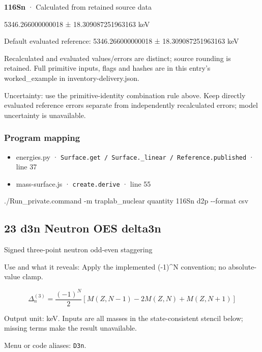 \documentclass[
  11pt,
  letterpaper,
]{article}
\newenvironment{Shaded}{}{}
\newcommand{\AttributeTok}[1]{\textcolor[rgb]{0.49,0.56,0.16}{#1}}
\newcommand{\ExtensionTok}[1]{#1}
\newcommand{\NormalTok}[1]{#1}
\providecommand{\tightlist}{%
  \setlength{\itemsep}{0pt}\setlength{\parskip}{0pt}}
\begin{document}
\textbf{116Sn} · Calculated from retained source data

5346.266000000018 ± 18.309087251963163 keV

Default evaluated reference: 5346.266000000018 ± 18.309087251963163 keV

Recalculated and evaluated values/errors are distinct; source rounding
is retained. Full primitive inputs, flags and hashes are in this entry's
worked\_example in inventory-delivery.json.

Uncertainty: use the primitive-identity combination rule above. Keep
directly evaluated reference errors separate from independently
recalculated errors; model uncertainty is unavailable.

\subsubsection{Program mapping}\label{program-mapping-21}

\begin{itemize}
\tightlist
\item
  energies.py ·
  \texttt{Surface.get\ /\ Surface.\_linear\ /\ Reference.published} ·
  line 37
\item
  mass-surface.js · \texttt{create.derive} · line 55
\end{itemize}

\begin{Shaded}
\begin{Highlighting}[]
\ExtensionTok{./Run\_private.command} \AttributeTok{{-}m}\NormalTok{ traplab\_nuclear quantity 116Sn d2p }\AttributeTok{{-}{-}format}\NormalTok{ csv}
\end{Highlighting}
\end{Shaded}

\subsection{23 d3n Neutron OES delta3n}\label{d3n-neutron-oes-delta3n}

Signed three-point neutron odd-even staggering

Use and what it reveals: Apply the implemented (-1)\^{}N convention; no
absolute-value clamp.

\[
\Delta_n^{(3)}=\frac{(-1)^N}{2}[M(Z,N-1)-2M(Z,N)+M(Z,N+1)]
\]

Output unit: keV. Inputs are all masses in the state-consistent stencil
below; missing terms make the result unavailable.

Menu or code aliases: \texttt{D3n}.
\end{document}
